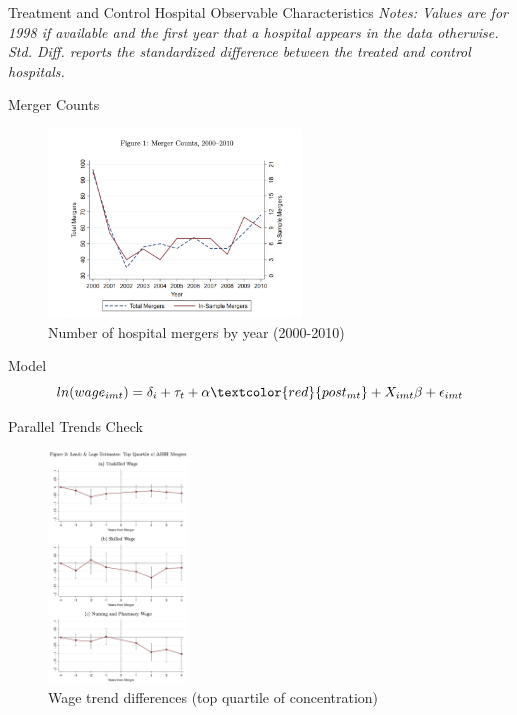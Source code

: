 \documentclass{beamer}
\begin{document}
\begin{frame}{Treatment and Control Hospital Observable Characteristics}
\medskip
\tiny\emph{Notes: Values are for 1998 if available and the first year that a hospital appears in the data otherwise. Std. Diff. reports the standardized difference between the treated and control hospitals.}
\end{frame}

\begin{frame}{Merger Counts}
  \begin{figure}
    \centering
    \includegraphics[width=0.6\textwidth]{merger_counts.png}
    \caption{Number of hospital mergers by year (2000-2010)}
  \end{figure}
\end{frame}

\begin{frame}{Model}
  \begin{equation}
    ln(wage_{imt}) = \delta_i + \tau_t + \alpha \textcolor{red}{post_{mt}} + X_{imt}\beta + \epsilon_{imt}
  \end{equation}
\end{frame}

\begin{frame}{Parallel Trends Check}
  \begin{figure}
    \centering
    \includegraphics[width=0.33\textwidth]{parallel_trends.png}
    \caption{Wage trend differences (top quartile of concentration)}
  \end{figure}
\end{frame}
\end{document}
